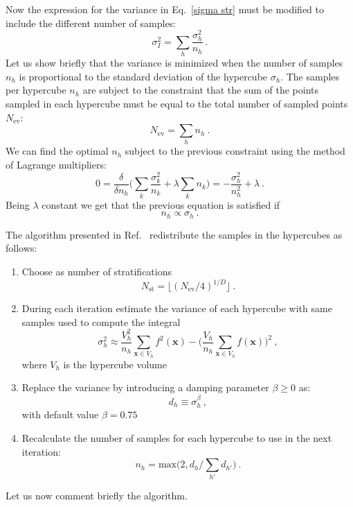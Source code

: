 \documentclass[../main/main.tex]{subfiles}
\begin{document}
Now the expression for the variance in Eq.~\ref{sigma str} must be modified to include the different number of samples:
\begin{equation}
		\sigma^2_I = \sum_h  \frac{\sigma^2_h}{n_h} \ .
\end{equation}
Let us show briefly that the variance is minimized when the number of samples $n_h$ is proportional to the standard deviation of the hypercube 
$\sigma_h$.
The samples per hypercube $n_h$ are subject to the constraint that the sum of the points sampled in each hypercube  must be equal to the total number of sampled
points $N_\text{ev}$:
\begin{equation}
	N_\text{ev} = \sum_h n_h \ .
\end{equation}
We can find the optimal $n_h$ subject to the previous constraint using the method of Lagrange multipliers:
\begin{equation}
	0 = \frac{\delta}{\delta n_h} \bigg( \sum_k \frac{\sigma^2_k}{n_k} + \lambda \sum_k n_k\bigg) =  - \frac{\sigma^2_h}{n^2_h} + \lambda \ .
\end{equation}
Being $\lambda$ constant we get that the previous equation is satisfied if
\begin{equation}
	n_h \propto \sigma_h \ .
\end{equation}

The algorithm presented in Ref.~\cite{Lepage:2020tgj} redistribute the samples in the hypercubes as follows:

\begin{enumerate}
\item Choose as number of stratifications
\begin{equation}
		\label{nstrat}
		N_\text{st} = \lfloor (N_\text{ev}/4)^{1/D}\rfloor  \ .
\end{equation}
\item During each iteration estimate the variance of each hypercube with same samples used to compute the integral
\begin{equation}
	\sigma^2_h \approx \frac{V_h^2}{n_h} \sum_{\textbf{x} \in V_h} f^2(\textbf{x}) - \bigg( \frac{V_h}{n_h} \sum_{\textbf{x} \in V_h} f(\textbf{x})\bigg)^2 \ ,
\end{equation}
where $V_h$ is the hypercube volume
\item Replace the variance by introducing a damping parameter $\beta \ge 0$ as:
\begin{equation}
	d_h \equiv \sigma_h^\beta \ ,
\end{equation}
with default value $\beta = 0.75$
\item 
Recalculate the number of samples for each hypercube to use in the next iteration:
\begin{equation}
	n_h = \text{max} \big(2, d_h / \sum_{h'} d_{h'}\big) \ .
\end{equation}
\end{enumerate}
Let us now comment briefly the algorithm.
\end{document}

